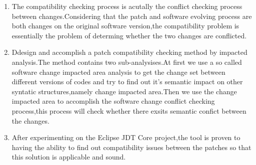 \begin{eabstract}
		\begin{enumerate}
			\item The compatibility checking process is acutally the conflict checking process between changes.Considering that the patch and software evolving process are both changes on the original software version,the compatibility problem is essentially the problem of determing whether the two changes are conflicted.
			\item Ddesign and accomplish a patch compatibility checking method by impacted analysis.The method contains two sub-analysises.At first we use a so called software change impacted area analysis to get the change set between different versions of codes and try to find out it's semantic impact on other syntatic structures,namely change impacted area.Then we use the change impacted area to accomplish the software change conflict checking process,this process will check whether there exsits semantic confict between the changes.
			\item After experimenting on the Eclipse JDT Core project,the tool is proven to having the ability to find out compatibility issues between the patches so that this solution is applicable and sound.
		\end{enumerate}
		
%		
%		
		
		

\end{eabstract}
